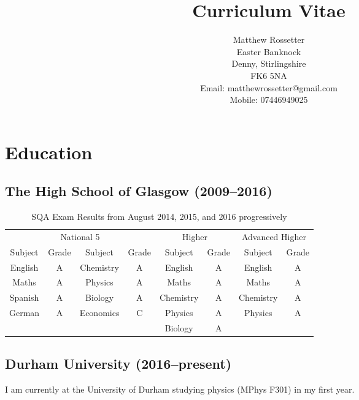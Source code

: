 \documentclass[10pt, a4paper]{article}
\title{\vspace{-2.2cm}Curriculum Vitae\vspace{-0.75cm}}
\author{Matthew Rossetter \\ Easter Banknock \\ Denny, Stirlingshire \\ FK6 5NA \\ Email: matthewrossetter@gmail.com \\ Mobile: 07446949025}
\date{\vspace{-1.5cm}}
\begin{document}
\maketitle
\thispagestyle{fancy}
\section{Education}
	\subsection{The High School of Glasgow (2009--2016)}
	\begin{table}[htbp]
		\centering
			\caption{SQA Exam Results from August 2014, 2015, and 2016 progressively}
	    	\begin{tabular}{|r|r|r|r|c|c|c|r|}
		    \multicolumn{4}{|c|}{National 5} & \multicolumn{2}{c|}{Higher} & \multicolumn{2}{c|}{Advanced Higher} \\
		    \multicolumn{1}{|c|}{Subject} & \multicolumn{1}{c|}{Grade} & \multicolumn{1}{c|}{Subject} & \multicolumn{1}{c|}{Grade} & Subject & Grade & Subject & \multicolumn{1}{c|}{Grade} \\
			\hline
		    \multicolumn{1}{|c|}{English} & \multicolumn{1}{c|}{A} & \multicolumn{1}{c|}{Chemistry} & \multicolumn{1}{c|}{A} & English & A     & English & \multicolumn{1}{c|}{A} \\
		    \multicolumn{1}{|c|}{Maths} & \multicolumn{1}{c|}{A} & \multicolumn{1}{c|}{Physics} & \multicolumn{1}{c|}{A} & Maths & A     & Maths & \multicolumn{1}{c|}{A} \\
		    \multicolumn{1}{|c|}{Spanish} & \multicolumn{1}{c|}{A} & \multicolumn{1}{c|}{Biology} & \multicolumn{1}{c|}{A} & Chemistry & A     & Chemistry & \multicolumn{1}{c|}{A} \\
		    \multicolumn{1}{|c|}{German} & \multicolumn{1}{c|}{A} & \multicolumn{1}{c|}{Economics} & \multicolumn{1}{c|}{C} & Physics & A     & Physics & \multicolumn{1}{c|}{A} \\
		          &       &       &       & Biology & A     &       &  \\
			\end{tabular}%
	\end{table}%
	\subsection{Durham University (2016--present)}
	I am currently at the University of Durham studying physics (MPhys F301) in my first year.
\end{document}
